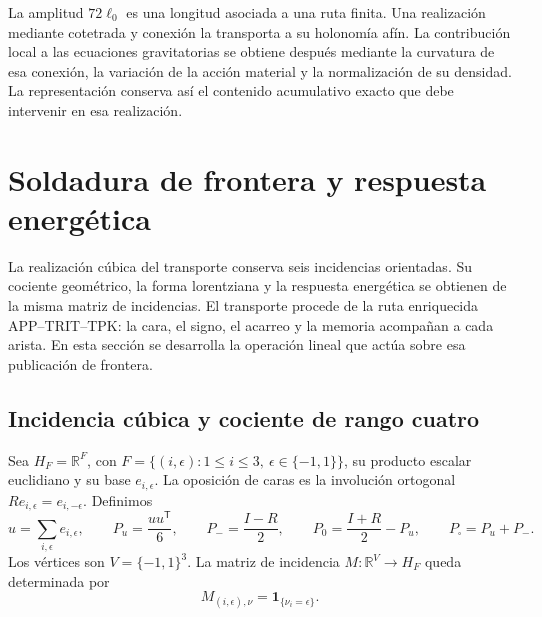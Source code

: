 La amplitud \(72\ell_0\) es una longitud asociada a una ruta finita.
Una realización mediante cotetrada y conexión la transporta a su
holonomía afín. La contribución local a las ecuaciones gravitatorias
se obtiene después mediante la curvatura de esa conexión, la
variación de la acción material y la normalización de su densidad.
La representación conserva así el contenido acumulativo exacto que
debe intervenir en esa realización.




\chapter{Soldadura de frontera y respuesta energética}
\label{x_reciprocidad:vii:sec:pantalla-respuesta}

La realización cúbica del transporte conserva seis incidencias orientadas.
Su cociente geométrico, la forma lorentziana y la respuesta energética
se obtienen de la misma matriz de incidencias. El transporte procede de
la ruta enriquecida APP--TRIT--TPK: la cara, el signo, el acarreo y la
memoria acompañan a cada arista. En esta sección se desarrolla la
operación lineal que actúa sobre esa publicación de frontera.

\section{Incidencia cúbica y cociente de rango cuatro}
\label{x_reciprocidad:vii:sec:cociente-pantalla}

Sea \(H_F=\mathbb R^F\), con
\(F=\{(i,\epsilon):1\leq i\leq3,\ \epsilon\in\{-1,1\}\}\),
su producto escalar euclidiano y su base \(e_{i,\epsilon}\).
La oposición de caras es la involución ortogonal
\(Re_{i,\epsilon}=e_{i,-\epsilon}\). Definimos
\[
 u=\sum_{i,\epsilon}e_{i,\epsilon},\qquad
 P_u=\frac{uu^{\mathsf T}}6,\qquad P_-=\frac{I-R}{2},\qquad
 P_0=\frac{I+R}{2}-P_u,\qquad P_\square=P_u+P_-.
\]
Los vértices son \(V=\{-1,1\}^3\). La matriz de incidencia
\(M:\mathbb R^V\longrightarrow H_F\) queda determinada por
\[
 M_{(i,\epsilon),\nu}=\mathbf1_{\{\nu_i=\epsilon\}}.
\]

